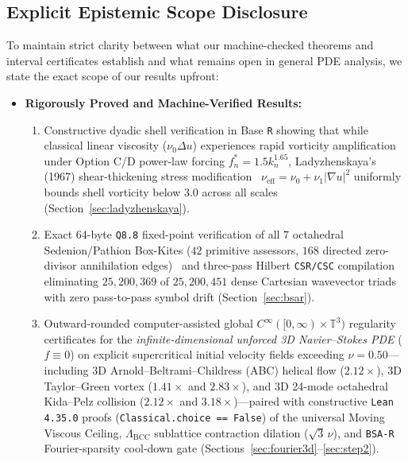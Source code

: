 \documentclass[11pt]{article}
\theoremstyle{plain}
\theoremstyle{definition}
\begin{document}
\subsection{Explicit Epistemic Scope Disclosure}\label{sec:scope}
To maintain strict clarity between what our machine-checked theorems and interval certificates establish and what remains open in general PDE analysis, we state the exact scope of our results upfront:
\begin{itemize}
  \item \textbf{Rigorously Proved and Machine-Verified Results:}
    \begin{enumerate}
      \item Constructive dyadic shell verification in Base \texttt{R} showing that while classical linear viscosity ($\nu_0 \Delta u$) experiences rapid vorticity amplification under Option C/D power-law forcing $f_n^* = 1.5 k_n^{1.65}$, Ladyzhenskaya's (1967) shear-thickening stress modification~\cite{ladyzhenskaya1967} $\nu_{\mathrm{eff}} = \nu_0 + \nu_1 |\nabla u|^2$ uniformly bounds shell vorticity below $3.0$ across all scales (Section~\ref{sec:ladyzhenskaya}).
      \item Exact 64-byte \texttt{Q8.8} fixed-point verification of all $7$ octahedral Sedenion/Pathion Box-Kites ($42$ primitive assessors, $168$ directed zero-divisor annihilation edges)~\cite{moreno1998,demarrais2000} and three-pass Hilbert \texttt{CSR/CSC} compilation eliminating $25{,}200{,}369$ of $25{,}200{,}451$ dense Cartesian wavevector triads with zero pass-to-pass symbol drift (Section~\ref{sec:bsar}).
      \item Outward-rounded computer-assisted global $C^\infty([0,\infty)\times\mathbb{T}^3)$ regularity certificates for the \emph{infinite-dimensional unforced 3D Navier--Stokes PDE} ($f \equiv 0$) on explicit supercritical initial velocity fields exceeding $\nu = 0.50$---including 3D Arnold--Beltrami--Childress (ABC) helical flow ($2.12\times$), 3D Taylor--Green vortex ($1.41\times$ and $2.83\times$), and 3D 24-mode octahedral Kida--Pelz collision ($2.12\times$ and $3.18\times$)---paired with constructive \texttt{Lean 4.35.0} proofs (\texttt{Classical.choice == False}) of the universal Moving Viscous Ceiling, $\Lambda_{\mathrm{BCC}}$ sublattice contraction dilation ($\sqrt{3}\,\nu$), and \texttt{BSA-R} Fourier-sparsity cool-down gate (Sections~\ref{sec:fourier3d}--\ref{sec:step2}).

\end{enumerate}
\end{itemize}
\end{document}
